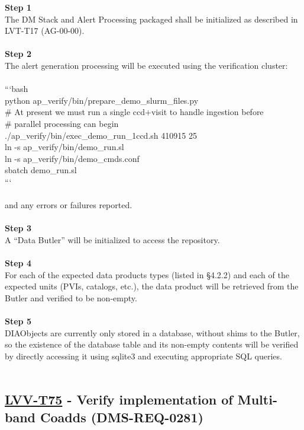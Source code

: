 \textbf{Step 1}\\
The DM Stack and Alert Processing packaged shall be initialized as
described in LVT-T17 (AG-00-00).\\
~\\
\textbf{Step 2}\\
The alert generation processing will be executed using the verification
cluster:\\
~\\
```bash\\
python ap\_verify/bin/prepare\_demo\_slurm\_files.py\\
\# At present we must run a single ccd+visit to handle ingestion
before\\
\# parallel processing can begin\\
./ap\_verify/bin/exec\_demo\_run\_1ccd.sh 410915 25\\
ln -s ap\_verify/bin/demo\_run.sl\\
ln -s ap\_verify/bin/demo\_cmds.conf\\
sbatch demo\_run.sl\\
```\\
~\\
and any errors or failures reported.\\
~\\
\textbf{Step 3}\\
A ``Data Butler'' will be initialized to access the repository.\\
~\\
\textbf{Step 4}\\
For each of the expected data products types (listed in §4.2.2) and each
of the expected units (PVIs, catalogs, etc.), the data product will be
retrieved from the Butler and verified to be non-empty.\\
~\\
\textbf{Step 5}\\
DIAObjects are currently only stored in a database, without shims to the
Butler, so the existence of the database table and its non-empty
contents will be verified by directly accessing it using sqlite3 and
executing appropriate SQL queries.\\
~\\

\hypertarget{lvv-t75---verify-implementation-of-multi-band-coadds-dms-req-0281}{%
\subsection{\texorpdfstring{\href{https://jira.lsstcorp.org/secure/Tests.jspa\#/testCase/LVV-T75}{LVV-T75}
- Verify implementation of Multi-band Coadds
(DMS-REQ-0281)}{LVV-T75 - Verify implementation of Multi-band Coadds (DMS-REQ-0281)}}\label{lvv-t75---verify-implementation-of-multi-band-coadds-dms-req-0281}}

